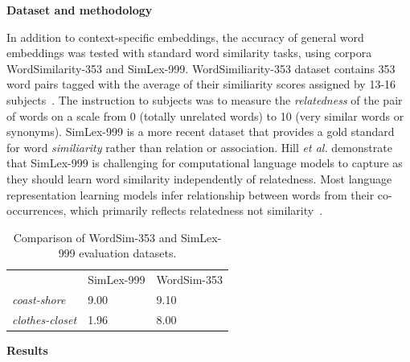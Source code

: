 \documentclass[a4paper,12pt,twoside,openright]{report}
\newcommand{\tb}{\vspace{10pt} \textbf}
\newcommand{\ti}{\textit}
\begin{document}
\tb{Dataset and methodology}

In addition to context-specific embeddings, the accuracy of general word embeddings was tested with standard word similarity tasks, using corpora WordSimilarity-353 and SimLex-999. WordSimiliarity-353 dataset contains 353 word pairs tagged with the average of their similiarity scores assigned by 13-16 subjects~\cite{finkelstein02}. The instruction to subjects was to measure the \ti{relatedness} of the pair of words on a scale from 0 (totally unrelated words) to 10 (very similar words or synonyms). SimLex-999 is a more recent dataset that provides a gold standard for word \ti{similiarity} rather than relation or association. Hill \ti{et al.} demonstrate that SimLex-999 is challenging for computational language models to capture as they should learn word similarity independently of relatedness. Most language representation learning models infer relationship between words from their co-occurrences, which primarily reflects relatedness not similarity~\cite{hill14}.

\begin{table}[h]
\centering
\begin{tabular}{lll}
           & SimLex-999 & WordSim-353 \\ \cline{2-3}
\ti{coast-shore}    & 9.00              & 9.10               \\
\ti{clothes-closet} & 1.96              & 8.00              \\ \cline{2-3}
\end{tabular}
\caption{Comparison of WordSim-353 and SimLex-999 evaluation datasets.}
\end{table}

\tb{Results}
\end{document}

